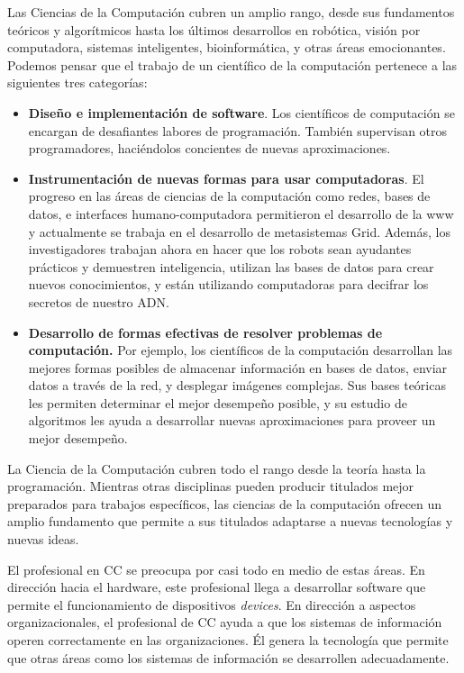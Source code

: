 Las Ciencias de la Computación cubren un amplio rango, desde sus fundamentos teóricos y algorítmicos hasta 
los \'ultimos desarrollos en robótica, visión por computadora, sistemas inteligentes, bioinformática, y 
otras áreas emocionantes. Podemos pensar que el trabajo de un científico de la computación pertenece 
a las siguientes tres categorías:

\begin{itemize}
\item \textbf{Diseño e implementación de software}. Los científicos de computación se encargan de 
desafiantes labores de programación. También supervisan otros programadores, haciéndolos concientes 
de nuevas aproximaciones.

\item \textbf{Instrumentación de nuevas formas para usar computadoras}. El progreso en las áreas 
de ciencias de la computación como redes, bases de datos, e interfaces humano-computadora permitieron 
el desarrollo de la www y actualmente se trabaja en el desarrollo de metasistemas Grid. Además, 
los investigadores trabajan ahora en hacer que los robots sean ayudantes prácticos y demuestren 
inteligencia, utilizan las bases de datos para crear nuevos conocimientos, y están utilizando 
computadoras para decifrar los secretos de nuestro ADN.

\item \textbf{Desarrollo de formas efectivas de resolver problemas de computación.} 
Por ejemplo, los científicos de la computación desarrollan las mejores formas posibles 
de almacenar información en bases de datos, enviar datos a través de la red, y 
desplegar imágenes complejas. Sus bases teóricas les permiten determinar el 
mejor desempeño posible, y su estudio de algoritmos les ayuda a desarrollar 
nuevas aproximaciones para proveer un mejor desempeño.
\end{itemize}

La Ciencia de la Computación cubren todo el rango desde la teoría hasta la programación. Mientras otras disciplinas pueden producir titulados mejor preparados para trabajos específicos, las ciencias de la computación ofrecen un amplio fundamento que permite a sus titulados adaptarse a nuevas tecnologías y nuevas ideas.

El profesional en \ac{CC} se preocupa por casi todo en medio de estas áreas. En dirección hacia el hardware, este profesional llega a desarrollar software que permite el funcionamiento de dispositivos {\it devices}. En dirección a aspectos organizacionales, el profesional de \ac{CC} ayuda a que los sistemas de información operen correctamente en las organizaciones. Él genera la tecnología que permite que otras áreas como los sistemas de información se desarrollen adecuadamente.

